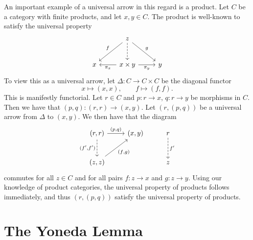 An important example of a universal arrow in this regard is a product. Let $C$ be a category with finite products, and let $x,y\in C$. The product is well-known to satisfy the universal property
\[\begin{tikzcd}[row sep = 2.5em, column sep = 2.5em]
 & z\ar[" f "', dl] \ar[" g ", dr] \ar[dashed, d]  &  \\
x & x\times y\ar[" \pi _x ", l] \ar[" \pi _y "', r]  & y
\end{tikzcd}\]
To view this as a universal arrow, let $\Delta : C \to C\times C$ be the diagonal functor
\[
	x\mapsto (x,x),\qquad f\mapsto (f,f)
.\]
This is manifestly functorial. Let $r\in C$ and $p : r \to x$, $q : r \to y$ be morphisms in $C$. Then we have that $(p,q): (r,r) \to (x,y)$. Let $(r,(p,q))$ be a universal arrow from $\Delta $ to $(x,y)$. We then have that the diagram
\[\begin{tikzcd}[row sep = 2.5em, column sep = 2.5em]
	(r,r)\ar[" (p \text{,} q) ", r] \ar["(f'\text{,}f')"', dashed, d]  & (x,y) & r\ar[" f' ", dashed, d]  \\
	(z,z)\ar[" (f\text{,}g) "', ur]  &  & z
\end{tikzcd}\]
commutes for all $z\in C$ and for all pairs $f : z \to x$ and $g : z \to y$. Using our knowledge of product categories, the universal property of products follows immediately, and thus $(r,(p,q))$ satisfy the universal property of products.

\section{The Yoneda Lemma}

